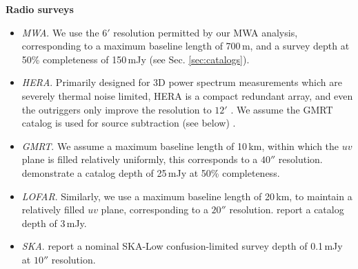 \documentclass[numberedappendix]{emulateapj}
\providecommand{\DIFaddbegin}{} %
\providecommand{\DIFaddend}{} %
\providecommand{\DIFdelbegin}{} %
\providecommand{\DIFdelend}{} %
\begin{document}
\noindent\textbf{Radio surveys}
\begin{itemize}
\item \textit{MWA}. We use the $6'$ resolution permitted by our MWA analysis, corresponding to a maximum baseline length of 700\,m, and a survey depth at 50\% completeness of 150\,mJy (see Sec. \ref{sec:catalogs}).
\item \textit{HERA}. Primarily designed for 3D power spectrum measurements which are severely thermal noise limited, HERA is a compact redundant array, and even the outriggers only improve the resolution to $12'$ \DIFaddbegin \citep{deboer16}\DIFaddend . We assume the GMRT catalog is used for source subtraction (see below) \DIFdelbegin %
\DIFdelend .
\item \textit{GMRT}. We assume a maximum baseline length of 10\,km, within which the $uv$ plane is filled relatively uniformly, this corresponds to a $40''$ resolution. \citet{intema17} demonstrate a catalog depth of 25\,mJy at 50\% completeness.
\item \textit{LOFAR}. Similarly, we use a maximum baseline length of 20\,km, to maintain a relatively filled $uv$ plane, corresponding to a $20''$ resolution. \citet{lofareorpaper} report a catalog depth of 3\,mJy. 
\item \textit{SKA}. \citet{prandoni15} report a nominal SKA-Low confusion-limited survey depth of 0.1\,mJy at $10''$ resolution.
\end{itemize}
\end{document}
